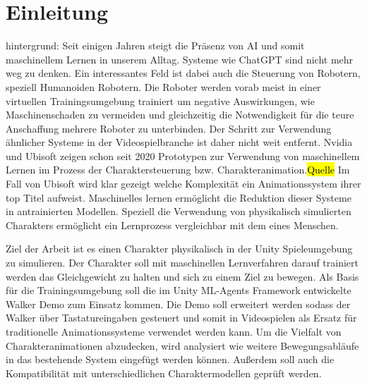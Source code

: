 \chapter{Einleitung}
\label{sec:einleitung}
hintergrund:
Seit einigen Jahren steigt die Präsenz von AI und somit maschinellem Lernen in unserem Alltag. Systeme wie ChatGPT sind nicht mehr weg zu denken. Ein interessantes Feld ist dabei auch die Steuerung von Robotern, speziell Humanoiden Robotern. Die Roboter werden vorab meist in einer virtuellen Trainingsumgebung trainiert um negative Auswirkungen, wie Maschinenschaden zu vermeiden und gleichzeitig die Notwendigkeit für die teure Anschaffung mehrere Roboter zu unterbinden. Der Schritt zur Verwendung ähnlicher Systeme in der Videospielbranche ist daher nicht weit entfernt. Nvidia und Ubisoft zeigen schon seit 2020 Prototypen zur Verwendung von maschinellem Lernen im Prozess der Charaktersteuerung bzw. Charakteranimation.\hl{Quelle} Im Fall von Ubisoft wird klar gezeigt welche Komplexität ein Animationssystem ihrer top Titel aufweist. Maschinelles lernen ermöglicht die Reduktion dieser Systeme in antrainierten Modellen. Speziell die Verwendung von physikalisch simulierten Charakters ermöglicht ein Lernprozess vergleichbar mit dem eines Menschen.

Ziel der Arbeit ist es einen Charakter physikalisch in der Unity Spieleumgebung zu simulieren. Der Charakter soll mit maschinellen Lernverfahren darauf trainiert werden das Gleichgewicht zu halten und sich zu einem Ziel zu bewegen. Als Basis für die Trainingsumgebung soll die im Unity ML-Agents Framework entwickelte Walker Demo zum Einsatz kommen. Die Demo soll erweitert werden sodass der Walker über Tastatureingaben gesteuert und somit in Videospielen als Ersatz für traditionelle Animationssysteme verwendet werden kann. Um die Vielfalt von Charakteranimationen abzudecken, wird analysiert wie weitere Bewegungsabläufe in das bestehende System eingefügt werden können. Außerdem soll auch die Kompatibilität mit unterschiedlichen Charaktermodellen geprüft werden.

